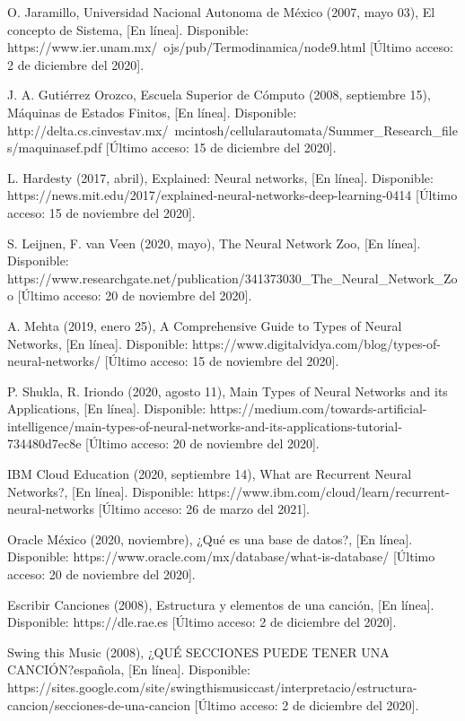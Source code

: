 \documentclass[12pt, a4paper, titlepage]{report}
\begin{document}
\begin{thebibliography}{20}
		O. Jaramillo, Universidad Nacional Autonoma de México (2007, mayo 03), El concepto de Sistema, [En línea]. Disponible: https://www.ier.unam.mx/~ojs/pub/Termodinamica/node9.html [Último acceso: 2 de diciembre del 2020].

		J. A. Gutiérrez Orozco, Escuela Superior de Cómputo (2008, septiembre 15), Máquinas de Estados Finitos, [En línea]. Disponible: http://delta.cs.cinvestav.mx/~mcintosh/cellularautomata/Summer\_Research\_files/maquinasef.pdf [Último acceso: 15 de diciembre del 2020].

		L. Hardesty  (2017, abril), Explained: Neural networks, [En línea]. Disponible: https://news.mit.edu/2017/explained-neural-networks-deep-learning-0414 [Último acceso: 15 de noviembre del 2020].

		S. Leijnen, F. van Veen (2020, mayo), The Neural Network Zoo, [En línea]. Disponible: https://www.researchgate.net/publication/341373030\_The\_Neural\_Network\_Zoo [Último acceso: 20 de noviembre del 2020].

		A. Mehta (2019, enero 25), A Comprehensive Guide to Types of Neural Networks, [En línea]. Disponible: https://www.digitalvidya.com/blog/types-of-neural-networks/ [Último acceso: 15 de noviembre del 2020].

		P. Shukla, R. Iriondo (2020, agosto 11), Main Types of Neural Networks and its Applications, [En línea]. Disponible: https://medium.com/towards-artificial-intelligence/main-types-of-neural-networks-and-its-applications-tutorial-734480d7ec8e [Último acceso: 20 de noviembre del 2020].
		
		IBM Cloud Education (2020, septiembre 14), What are Recurrent Neural Networks?, [En línea]. Disponible: https://www.ibm.com/cloud/learn/recurrent-neural-networks [Último acceso: 26 de marzo del 2021].

		Oracle México (2020, noviembre), ¿Qué es una base de datos?, [En línea]. Disponible: https://www.oracle.com/mx/database/what-is-database/ [Último acceso: 20 de noviembre del 2020].

		Escribir Canciones (2008), Estructura y elementos de una canción, [En línea]. Disponible: https://dle.rae.es [Último acceso: 2 de diciembre del 2020].

		Swing this Music (2008), ¿QUÉ SECCIONES PUEDE TENER UNA CANCIÓN?española, [En línea]. Disponible: https://sites.google.com/site/swingthismusiccast/interpretacio/estructura-cancion/secciones-de-una-cancion [Último acceso: 2 de diciembre del 2020].


\end{thebibliography}
\end{document}
